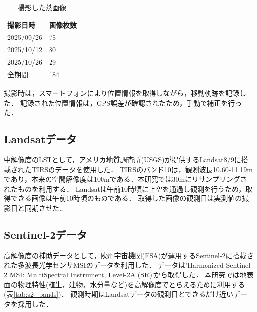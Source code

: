 \documentclass[12pt,epsf]{jreport}
\begin{document}
 \begin{table}[H]
  \centering
  \caption{撮影した熱画像}
  \label{tab:data_list}
  \begin{tabular}{|l|l|}
    \hline
    \textbf{撮影日時} & \textbf{画像枚数} \\
    \hline
    2025/09/26&75 \\
    \hline
    2025/10/12&80 \\
    \hline
    2025/10/26&29 \\
    \hline
    全期間&184 \\
    \hline
  \end{tabular}
\end{table}

撮影時は，スマートフォンにより位置情報を取得しながら，移動軌跡を記録した．
記録された位置情報は，GPS誤差が確認されたため，手動で補正を行った．

 \subsection{Landsatデータ}
 \label{subsec:Ls_LST}
 中解像度のLSTとして，アメリカ地質調査所(USGS)が提供するLandsat8/9に搭載されたTIRSのデータを使用した\cite{RESTEC_Landsat8}\cite{RESTEC_Landsat9}．
 TIRSのバンド10は，観測波長10.60-11.19\mu mであり，本来の空間解像度は100mである．本研究では30mにリサンプリングされたものを利用する．
 Landsatは午前10時頃に上空を通過し観測を行うため，取得できる画像は午前10時頃のものである．
 取得した画像の観測日は実測値の撮影日と同期させた．


 \subsection{Sentinel-2データ}
 \label{subsec:Sen_band}
 高解像度の補助データとして，欧州宇宙機関(ESA)が運用するSentinel-2に搭載された多波長光学センサMSIのデータを利用した．
 データは'Harmonized Sentinel-2 MSI: MultiSpectral Instrument, Level-2A (SR)'から取得した\cite{sentinel2_harmonized_gee,gorelick2017google}．
 本研究では地表面の物理特性(植生，建物，水分量など)を高解像度でとらえるために利用する(表\ref{tab:s2_bands})．
 観測時期はLandsatデータの観測日とできるだけ近いデータを採用した．
\end{document}
